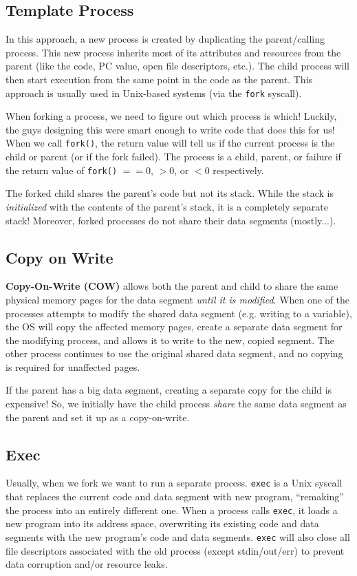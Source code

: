 \documentclass{report}
\newcommand{\definitionBegin}[1]{\begin{tcolorbox}[title={Definition: #1}]}
\newcommand{\definitionEnd}{\end{tcolorbox}}
\newcommand{\exampleBegin}[1]{\begin{tcolorbox}[colback=blue!5!white,colframe=black!75!blue,title={Example:
      #1}]}
\newcommand{\exampleEnd}{\end{tcolorbox}}
\newcommand{\corollaryBegin}[1]{\begin{tcolorbox}[colback=teal!5!white,colframe=black!75!teal,title={Corollary:
      #1}]}
\newcommand{\corollaryEnd}{\end{tcolorbox}}
\begin{document}
\subsection*{Template Process}
In this approach, a new process is created by duplicating the parent/calling process. This new
process inherits most of its attributes and resources from the parent (like the code, PC value, open
file descriptors, etc.). The child process will then start execution from the same point in the
code as the parent. This approach is usually used in Unix-based systems (via the \texttt{fork}
syscall).

\exampleBegin{Forking Forking}
When forking a process, we need to figure out which process is which! Luckily, the guys designing
this were smart enough to write code that does this for us! When we call \texttt{fork()}, the return
value will tell us if the current process is the child or parent (or if the fork failed). The
process is a child, parent, or failure if the return value of \texttt{fork()} $== 0$, $> 0$, or $<
0$ respectively.
\exampleEnd


\corollaryBegin{Fork/Exec}
The forked child shares the parent's code but not its stack. While the stack is \textit{initialized}
with the contents of the parent's stack, it is a completely separate stack! Moreover, forked
processes do not share their data segments (mostly...).
\corollaryEnd


\subsection*{Copy on Write}
\definitionBegin{Copy-On-Write}
\textbf{Copy-On-Write (COW)} allows both the parent and child to share the same physical memory
pages for the data segment \textit{until it is modified}. When one of the processes attempts to
modify the shared data segment (e.g. writing to a variable), the OS will copy the affected memory
pages, create a separate data segment for the modifying process, and allows it to write to
the new, copied segment. The other process continues to use the original shared data segment, and no
copying is required for unaffected pages.
\definitionEnd
If the parent has a big data segment, creating a separate copy for the child is expensive! So, we
initially have the child process \textit{share} the same data segment as the parent and set it up as
a copy-on-write.


\subsection*{Exec}
Usually, when we fork we want to run a separate process. \texttt{exec} is a Unix syscall that
replaces the current code and data segment with new program, ``remaking'' the process into an
entirely different one. When a process calls \texttt{exec}, it loads a new program into its address
space, overwriting its existing code and data segments with the new program's code and data
segments. \texttt{exec} will also close all file descriptors associated with the old process (except
stdin/out/err) to prevent data corruption and/or resource leaks. 
\end{document}
